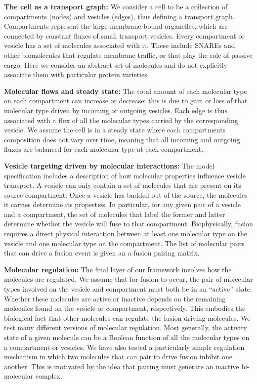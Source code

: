 
\textbf{The cell as a transport graph:} We consider a cell to be a collection of
compartments (nodes) and vesicles (edges), thus defining a transport graph.
Compartments represent the large membrane-bound organelles, which are
connected by constant fluxes of small transport vesicles. Every compartment
or vesicle has a set of molecules associated with it. These include SNAREs
and other biomolecules that regulate membrane traffic, or that play the
role of passive cargo. Here we consider an abstract set of molecules and do
not explicitly associate them with particular protein varieties.

\textbf{Molecular flows and steady state:} The total amount of each molecular type
on each compartment can increase or decrease: this is due to gain or loss
of that molecular type driven by incoming or outgoing vesicles. Each edge
is thus associated with a flux of all the molecular types carried by the
corresponding vesicle. We assume the cell is in a steady state where each
compartments composition does not vary over time, meaning that all
incoming and outgoing fluxes are balanced for each molecular type at each
compartment.

\textbf{Vesicle targeting driven by molecular interactions:} The model specification
includes a description of how molecular properties influence vesicle
transport. A vesicle can only contain a set of molecules that are present
on its source compartment. Once a vesicle has budded out of the source, the
molecules it carries determine its properties. In particular, for any given
pair of a vesicle and a compartment, the set of molecules that label the
former and latter determine whether the vesicle will fuse to that
compartment. Biophysically, fusion requires a direct physical interaction
between at least one molecular type on the vesicle and one molecular type
on the compartment. The list of molecular pairs that can drive a fusion
event is given an a fusion pairing matrix.

\textbf{Molecular regulation:} The final layer of our framework involves how the
molecules are regulated. We assume that for fusion to occur, the pair of
molecular types involved on the vesicle and compartment must both be in an
“active” state. Whether these molecules are active or inactive depends on
the remaining molecules found on the vesicle or compartment, respectively.
This embodies the biological fact that other molecules can regulate the
fusion-driving molecules. We test many different versions of molecular
regulation. Most generally, the activity state of a given molecule can be a
Boolean function of all the molecular types on a compartment or vesicles.
We have also tested a particularly simple regulation mechanism in which two
molecules that can pair to drive fusion inhibit one another. This is
motivated by the idea that pairing must generate an inactive bi-molecular
complex.

